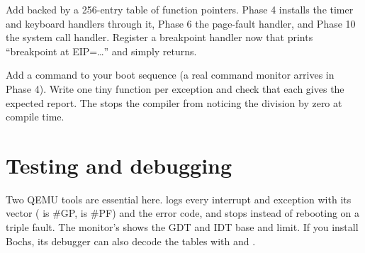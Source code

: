 \documentclass[11pt,a4paper]{article}
\begin{document}
Add  backed by a 256-entry table of function
pointers. Phase 4 installs the timer and keyboard handlers through it, Phase 6 the page-fault handler, and Phase 10
the system call handler. Register a breakpoint handler now that prints ``breakpoint at EIP=\dots'' and simply
returns.

Add a  command to your boot sequence (a real command monitor arrives in Phase 4). Write one tiny
function per exception and check that each gives the expected report. The  stops the compiler from
noticing the division by zero at compile time.


\section{Testing and debugging}

Two QEMU tools are essential here.  logs every interrupt and exception with its vector
( is \#GP,  is \#PF) and the error code, and stops instead of rebooting on a triple fault. The
monitor's  shows the GDT and IDT base and limit. If you install Bochs, its debugger can also
decode the tables with  and .
\end{document}
